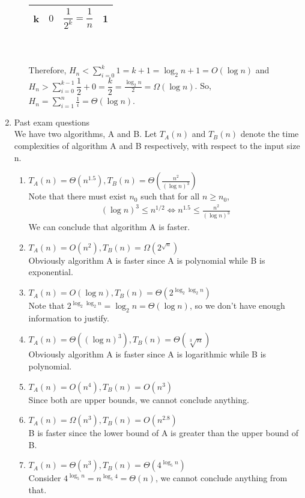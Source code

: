 \documentclass[11pt]{article}
\begin{document}
\begin{enumerate}
\begin{enumerate}
\begin{tabular}{|l|l|l|l|}
\hline
k&$0$& $\dfrac{1}{2^k} = \dfrac{1}{n}$& 1\\
\hline
\end{tabular}\\\\
Therefore, $H_n < \sum_{i=0}^{k} 1 = k +1 = \log_2 n +1 = O(\log n)$ and $H_n > \sum_{i=0}^{k-1} \dfrac{1}{2} +0 = \dfrac{k}{2} = \frac{\log_2 n}{2} = \Omega (\log n)$. So, $H_{n} = \sum_{i=1}^{n} \frac{1}{i} = \Theta(\log n)$.
\end{enumerate}
\item Past exam questions\\
We have two algorithms, A and B. Let $T_A (n)$ and $T_B (n)$ denote the time complexities of algorithm A and B respectively, with respect to the input size n. 
\begin{enumerate}
\item $T_{A} (n) = \Theta (n^{1.5}), T_{B} (n) = \Theta (\frac{n^{2}}{(\log n)^3})$\\
Note that there must exist $n_{0}$ such that for all $n \geq n_{0}$, \begin{align*}
(\log n)^3 \leq n^{1/2} \iff n^{1.5} \leq \frac{n^2}{(\log n)^3}
\end{align*}
We can conclude that algorithm A is faster.
\item $T_{A} (n) = O (n^{2}), T_{B} (n) = \Omega (2^{\sqrt{n}})$\\ Obviously algorithm A is faster since A is polynomial while B is exponential.
\item $T_{A} (n) = O (\log n), T_{B} (n) = \Theta (2^{\log_2 \log_2 n})$\\ Note that $2^{\log_2 \log_2 n} = \log_2 n = \Theta
(\log n)$, so we don't have enough information to justify.
\item $T_{A} (n) = \Theta ((\log n)^3), T_{B} (n) = \Theta (\sqrt[3]{n})$\\ Obviously algorithm A is faster since A is logarithmic while B is polynomial.
\item $T_{A} (n) =O(n^4), T_{B} (n) = O(n^3)$\\
Since both are upper bounds, we cannot conclude anything.
\item $T_{A} (n) =\Omega(n^3), T_{B} (n) = O(n^{2.8})$\\
B is faster since the lower bound of A is greater than the upper bound of B.
\item $T_{A} (n) =\Theta(n^3), T_{B} (n) = \Theta(4^{\log_5 n})$\\ Consider $4^{\log_5 n} = n^{\log_5 4} = \Theta(n)$, we cannot conclude anything from that.

\end{enumerate}
\end{enumerate}
\end{document}
